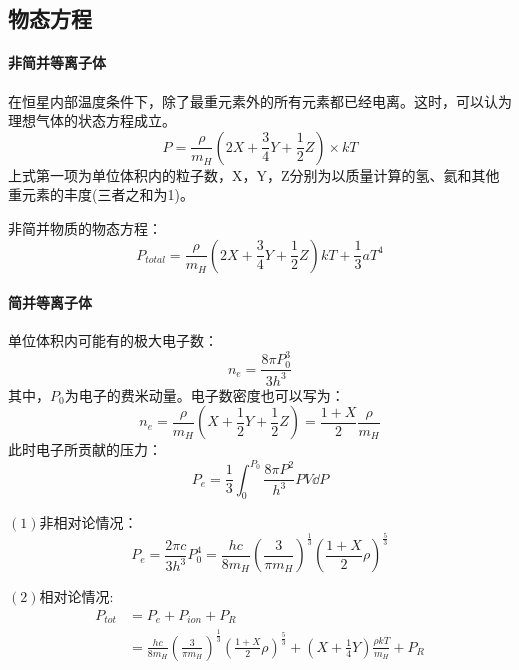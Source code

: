 \subsection{物态方程}
\paragraph{非简并等离子体}
在恒星内部温度条件下，除了最重元素外的所有元素都已经电离。这时，可以认为理想气体的状态方程成立。
\begin{equation}
	P=\frac{\rho}{m_{H}}\left(2X+\frac{3}{4}Y+\frac{1}{2}Z\right)\times kT
\end{equation}
上式第一项为单位体积内的粒子数，X，Y，Z分别为以质量计算的氢、氦和其他重元素的丰度(三者之和为1)。

非简并物质的物态方程：
\begin{equation}
	P_{total}=\frac{\rho}{m_{H}}\left(2X+\frac{3}{4}Y+\frac{1}{2}Z\right)kT+\frac{1}{3}aT^4
\end{equation}
\paragraph{简并等离子体}
单位体积内可能有的极大电子数：
\begin{equation}
	n_{e}=\frac{8\pi P_{0}^3}{3h^3}
\end{equation}
其中，$P_{0}$为电子的费米动量。电子数密度也可以写为：
\begin{equation}
	n_{e}=\frac{\rho}{m_{H}}\left(X+\frac{1}{2}Y+\frac{1}{2}Z\right)=\frac{1+X}{2}\frac{\rho}{m_{H}}
\end{equation}
此时电子所贡献的压力：
\begin{equation}
	P_{e}=\frac{1}{3}\int_{0}^{P_{0}}\frac{8\pi P^2}{h^3}PV\dd P
\end{equation}

$\left(1\right)$非相对论情况：
\begin{equation}
	P_{e}=\frac{2\pi c}{3h^3}P^4_{0}=\frac{hc}{8m_{H}}\left(\frac{3}{\pi m_{H}}\right)^\frac{1}{3}\left(\frac{1+X}{2}\rho\right)^\frac{5}{3}
\end{equation}

$\left(2\right)$相对论情况:
\begin{equation}
	\begin{split}
		P_{tot}&=P_{e}+P_{ion}+P_{R}\\
		&=\frac{hc}{8m_{H}}\left(\frac{3}{\pi m_{H}}\right)^\frac{1}{3}\left(\frac{1+X}{2}\rho\right)^\frac{5}{3}+\left(X+\frac{1}{4}Y\right)\frac{\rho kT}{m_{H}}+P_{R}
	\end{split}
\end{equation}
